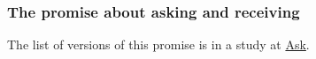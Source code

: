 	
		
	\subsubsection{The promise about asking and receiving}
		\label{PROMISE-ask}
		
		The list of versions of this promise is in a study at \hyperref[ASK-receive]{Ask}.